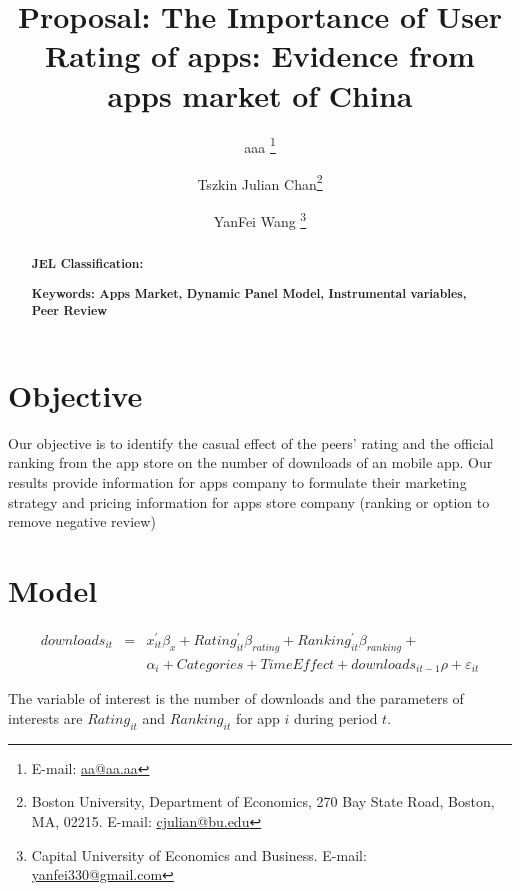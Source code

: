 \documentclass[11pt,twoside]{article}
\title{Proposal: The Importance of User Rating of apps: Evidence from apps market of China }
\author { 
	aaa \footnote{E-mail:  \protect\url{aa@aa.aa}} 
	\and Tszkin Julian Chan\footnote{Boston University, Department of Economics, 270 Bay State Road, Boston, MA, 02215. E-mail: \protect\url{cjulian@bu.edu}} 
	\and YanFei Wang \footnote{ Capital University of Economics and Business. E-mail: \protect\url{yanfei330@gmail.com}} 
}
\begin{document}
\maketitle
\begin{abstract}
\noindent \textbf{JEL Classification: } 

\noindent \textbf{Keywords: Apps Market, Dynamic Panel Model, Instrumental variables, Peer Review}  

\end{abstract}
\newpage


\section{Objective}
Our objective is to identify the casual effect of the peers' rating and the official ranking from the app store on the number of downloads of an mobile app. Our results provide information for apps company to formulate their marketing strategy and pricing information for apps store company (ranking or option to remove negative review)

\section{Model}

\begin{eqnarray} \label{eq:basic_eq}
	downloads_{it} &=& x_{it}^{'} \beta_{x} + Rating_{it}^{'} \beta_{rating} + Ranking_{it}^{'} \beta_{ranking} + \\
	&& \alpha_i + Categories + TimeEffect +  downloads_{it-1} \rho + \varepsilon_{it}
\end{eqnarray}
	
	The variable of interest is the number of downloads and the parameters of interests are $Rating_{it}$ and $Ranking_{it}$ for app $i$ during period $t$. 
\end{document}
